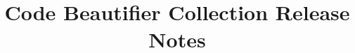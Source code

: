 \documentclass{book}
\author{\lextm}
\title{Code Beautifier Collection Release Notes}
\begin{document}
\frontmatter

\maketitle

\copyclaimer





\mainmatter




\end{document}
